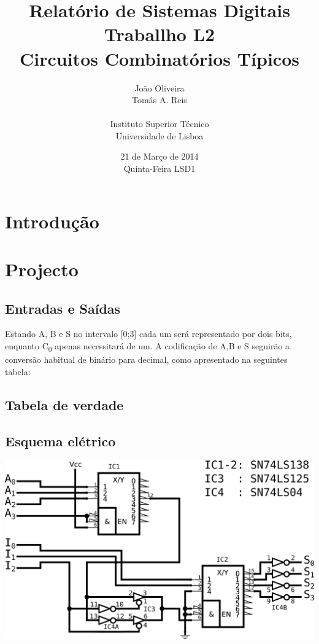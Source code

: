 \documentclass[a4paper,12pt]{article}
\begin{document}
\renewcommand{\sfdefault}{lmss}
\renewcommand{\familydefault}{\sfdefault}
\selectfont

\title{\bf Relatório de Sistemas Digitais \\
Traballho L2\\
Circuitos Combinatórios Típicos}
\author{João Oliveira\\
Tomás A. Reis\\
\\
Instituto Superior Técnico \\
Universidade de Lisboa}
\date{21 de Março de 2014 \\
Quinta-Feira LSD1}
\maketitle

\pagebreak
\section{Introdução}

\section{Projecto}

\subsection{Entradas e Saídas}
Estando A, B e S no intervalo [0;3] cada um será representado por dois bits, enquanto C\textsubscript{0} apenas necessitará de um. A codificação de A,B e S seguirão a conversão habitual de binário para decimal, como apresentado na seguintes tabela:

\subsection{Tabela de verdade}

\subsection{Esquema elétrico}
\includegraphics[scale=.1]{esqelect.eps}
\end{document}
